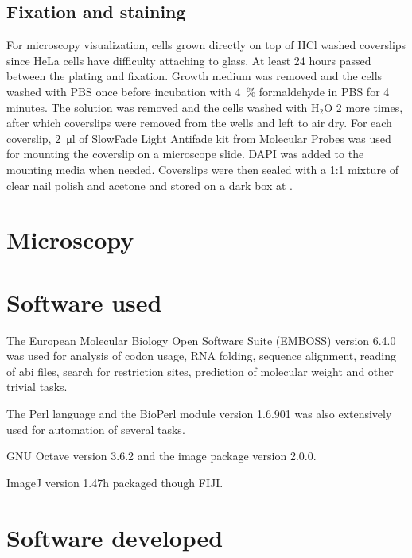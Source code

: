   \subsection{Fixation and staining}
    For microscopy visualization, cells grown directly on top of HCl washed coverslips since
    HeLa cells have difficulty attaching to glass. At least 24 hours passed
    between the plating and fixation. Growth medium was removed and the cells
    washed with PBS once before incubation with \SI{4}{\percent} formaldehyde in PBS
    for 4 minutes. The solution was removed and the cells washed with H$_2$O 2 more
    times, after which coverslips were removed from the wells and left to air dry.
    For each coverslip, \SI{2}{\ul} of SlowFade Light Antifade kit from Molecular Probes
    was used for mounting the coverslip on a microscope slide. DAPI was added
    to the mounting media when needed. Coverslips were then sealed with a 1:1
    mixture of clear nail polish and acetone and stored on a dark box at .


\section{Microscopy}
\section{Software used}
  The European Molecular Biology Open Software Suite (EMBOSS) version 6.4.0
  was used for analysis of codon usage, RNA folding, sequence alignment, reading of abi
  files, search for restriction sites, prediction of molecular weight and
  other trivial tasks.

  The Perl language and the BioPerl module version 1.6.901 was also extensively used for automation of
  several tasks.
  
  GNU Octave version 3.6.2 and the image package version 2.0.0.
  
  ImageJ version 1.47h packaged though FIJI.

\section{Software developed}




